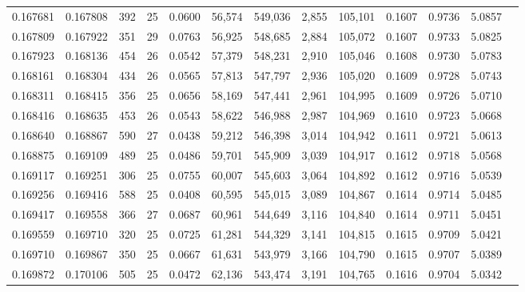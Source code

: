 \begin{tabular}{rrrrrrrrrrrrr}
0.167681 & 0.167808 &   392 &  25 &                                     0.0600 &  56,574 & 549,036 &   2,855 & 105,101 & 0.1607 & 0.9736 & 5.0857 \\
0.167809 & 0.167922 &   351 &  29 &                                     0.0763 &  56,925 & 548,685 &   2,884 & 105,072 & 0.1607 & 0.9733 & 5.0825 \\
0.167923 & 0.168136 &   454 &  26 &                                     0.0542 &  57,379 & 548,231 &   2,910 & 105,046 & 0.1608 & 0.9730 & 5.0783 \\
0.168161 & 0.168304 &   434 &  26 &                                     0.0565 &  57,813 & 547,797 &   2,936 & 105,020 & 0.1609 & 0.9728 & 5.0743 \\
0.168311 & 0.168415 &   356 &  25 &                                     0.0656 &  58,169 & 547,441 &   2,961 & 104,995 & 0.1609 & 0.9726 & 5.0710 \\
0.168416 & 0.168635 &   453 &  26 &                                     0.0543 &  58,622 & 546,988 &   2,987 & 104,969 & 0.1610 & 0.9723 & 5.0668 \\
0.168640 & 0.168867 &   590 &  27 &                                     0.0438 &  59,212 & 546,398 &   3,014 & 104,942 & 0.1611 & 0.9721 & 5.0613 \\
0.168875 & 0.169109 &   489 &  25 &                                     0.0486 &  59,701 & 545,909 &   3,039 & 104,917 & 0.1612 & 0.9718 & 5.0568 \\
0.169117 & 0.169251 &   306 &  25 &                                     0.0755 &  60,007 & 545,603 &   3,064 & 104,892 & 0.1612 & 0.9716 & 5.0539 \\
0.169256 & 0.169416 &   588 &  25 &                                     0.0408 &  60,595 & 545,015 &   3,089 & 104,867 & 0.1614 & 0.9714 & 5.0485 \\
0.169417 & 0.169558 &   366 &  27 &                                     0.0687 &  60,961 & 544,649 &   3,116 & 104,840 & 0.1614 & 0.9711 & 5.0451 \\
0.169559 & 0.169710 &   320 &  25 &                                     0.0725 &  61,281 & 544,329 &   3,141 & 104,815 & 0.1615 & 0.9709 & 5.0421 \\
0.169710 & 0.169867 &   350 &  25 &                                     0.0667 &  61,631 & 543,979 &   3,166 & 104,790 & 0.1615 & 0.9707 & 5.0389 \\
0.169872 & 0.170106 &   505 &  25 &                                     0.0472 &  62,136 & 543,474 &   3,191 & 104,765 & 0.1616 & 0.9704 & 5.0342 \\

\end{tabular}
